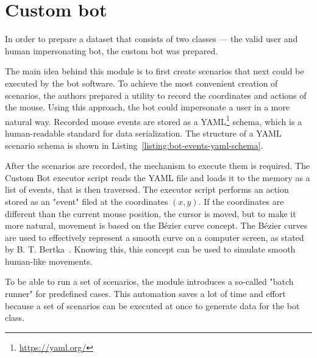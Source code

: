 \section{Custom bot}\label{sec:custom-bot}
In order to prepare a dataset that consists of two classes --- the valid user and human impersonating bot, the custom bot was prepared.

The main idea behind this module is to first create scenarios that next could be executed by the bot software.
To achieve the most convenient creation of scenarios, the authors prepared a utility to record the coordinates and actions of the mouse.
Using this approach, the bot could impersonate a user in a more natural way.
Recorded mouse events are stored as a YAML\footnote{\url{https://yaml.org/}} schema, which is a human-readable standard for data serialization.
The structure of a YAML scenario schema is shown in Listing~\ref{listing:bot-events-yaml-schema}.



After the scenarios are recorded, the mechanism to execute them is required.
The Custom Bot executor script reads the YAML file and loads it to the memory as a list of events, that is then traversed.
The executor script performs an action stored as an "event" filed at the coordinates $(x, y)$.
If the coordinates are different than the current mouse position, the cursor is moved, but to make it more natural, movement is based on the Bézier curve concept.
The Bézier curves are used to effectively represent a smooth curve on a computer screen, as stated by B. T. Bertka~\cite{bezier-curves}. Knowing this, this concept can be used to simulate smooth human-like movements.

To be able to run a set of scenarios, the module introduces a so-called "batch runner" for predefined cases.
This automation saves a lot of time and effort because a set of scenarios can be executed at once to generate data for the bot class.

